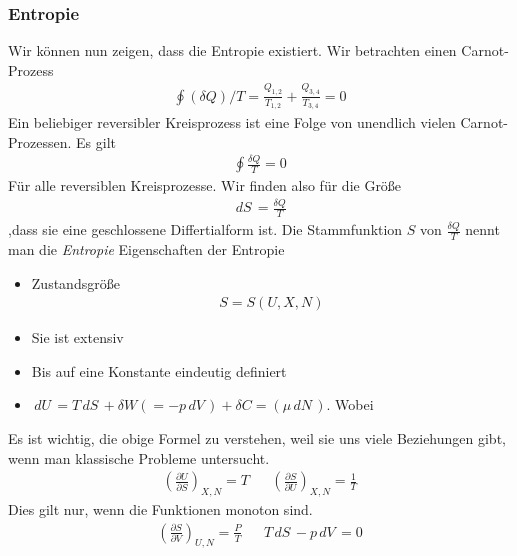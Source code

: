 \documentclass[11pt]{article}
\theoremstyle{plain}
\theoremstyle{mytheoremstyle}
\newcommand{\pd}[2]{\frac{\partial #1 }{\partial #2}}
\renewcommand{\d}[1]{\,d#1\,}
\begin{document}
\subsubsection*{Entropie}
Wir können nun zeigen, dass die Entropie existiert.
Wir betrachten einen Carnot-Prozess
%
\begin{align*}
  \oint (\delta Q)/T =\frac{Q_{1,2}}{T_{1,2}} +\frac{Q_{3,4}}{T_{3,4}} = 0
\end{align*}
%
Ein beliebiger reversibler Kreisprozess ist eine Folge von unendlich vielen
Carnot-Prozessen.
%
Es gilt
\begin{align*}
  \oint
\frac{\delta Q}{T} = 0 
\end{align*}
%
Für alle reversiblen Kreisprozesse. Wir finden also für die Größe
%
\begin{align*}
  \d{S} =\frac{\delta Q}{T} 
\end{align*}
,dass sie eine geschlossene Differtialform ist.
Die Stammfunktion $S$ von $\frac{\delta Q}{T}$ nennt man die \emph{Entropie}
Eigenschaften der Entropie
\begin{itemize}
  \item Zustandsgröße
    \begin{align*}
      S = S (U, X, N)
    \end{align*}
  \item Sie ist extensiv
  \item Bis auf eine Konstante eindeutig definiert
  \item $ \d{U} = T \d{S} + \delta W(=-p \d{V}) + \delta C = (\mu \d{N})$. Wobei 

\end{itemize}
    Es ist wichtig, die obige Formel zu verstehen, weil sie uns viele Beziehungen
    gibt, wenn man klassische Probleme untersucht.
%
\begin{align*}
  \left( \pd{U}{S} \right)_{X, N} = T && \left( \pd{S}{U} \right)_{X, N} =\frac{1}{T}
\end{align*}
%
Dies gilt nur, wenn die Funktionen monoton sind.
%
\begin{align*}
  \left( \pd{S}{V} \right)_{U, N} =\frac{P}{T} && T \d{S} - p \d{V} = 0
\end{align*}
%
\end{document}
